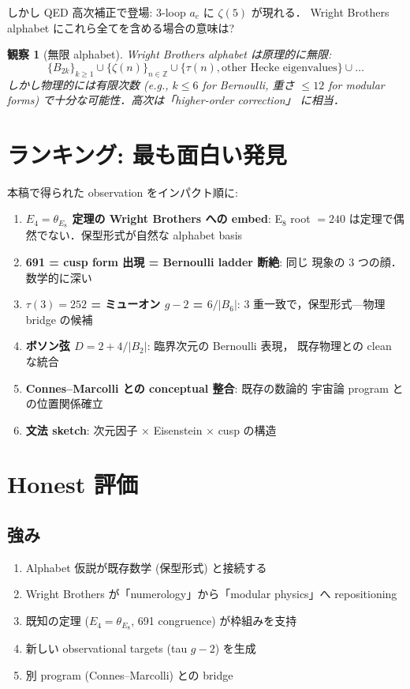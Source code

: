 \documentclass[11pt,a4paper]{article}
\newtheorem{observation}{観察}
\begin{document}
しかし QED 高次補正で登場: 3-loop $a_e$ に $\zeta(5)$ が現れる．
Wright Brothers alphabet にこれら全てを含める場合の意味は?

\begin{observation}[無限 alphabet]
Wright Brothers alphabet は原理的に無限:
\begin{equation}
\{B_{2k}\}_{k \geq 1} \cup \{\zeta(n)\}_{n \in \mathbb{Z}} \cup \{\tau(n), \text{other Hecke eigenvalues}\} \cup \ldots
\end{equation}
しかし物理的には有限次数 (e.g., $k \leq 6$ for Bernoulli, 重さ $\leq 12$
for modular forms) で十分な可能性．高次は「higher-order correction」
に相当．
\end{observation}

\section{ランキング: 最も面白い発見}

本稿で得られた observation をインパクト順に:

\begin{enumerate}
\item \textbf{$E_4 = \theta_{E_8}$ 定理の Wright Brothers への embed}:
E$_8$ root $= 240$ は定理で偶然でない．保型形式が自然な alphabet basis
\item \textbf{691 = cusp form 出現 = Bernoulli ladder 断絶}: 同じ
現象の 3 つの顔．数学的に深い
\item \textbf{$\tau(3) = 252$ = ミューオン $g-2$ = $6/|B_6|$}:
3 重一致で，保型形式—物理 bridge の候補
\item \textbf{ボソン弦 $D = 2 + 4/|B_2|$}: 臨界次元の Bernoulli 表現，
既存物理との clean な統合
\item \textbf{Connes--Marcolli との conceptual 整合}: 既存の数論的
宇宙論 program との位置関係確立
\item \textbf{文法 sketch}: 次元因子 × Eisenstein × cusp の構造
\end{enumerate}

\section{Honest 評価}

\subsection{強み}

\begin{enumerate}
\item Alphabet 仮説が既存数学 (保型形式) と接続する
\item Wright Brothers が「numerology」から「modular physics」へ
repositioning
\item 既知の定理 ($E_4 = \theta_{E_8}$, 691 congruence) が枠組みを支持
\item 新しい observational targets (tau $g-2$) を生成
\item 別 program (Connes--Marcolli) との bridge
\end{enumerate}
\end{document}
